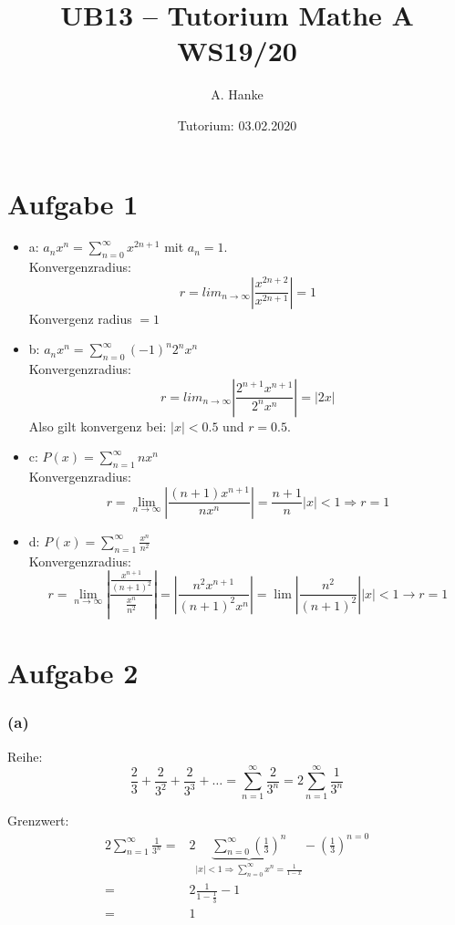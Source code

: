 \documentclass[]{article}
\title{UB13 -- Tutorium Mathe A WS19/20}
\author{A. Hanke}
\date{Tutorium: 03.02.2020}
\providecommand{\tightlist}{%
  \setlength{\itemsep}{0pt}\setlength{\parskip}{0pt}}
\begin{document}
\maketitle

\hypertarget{aufgabe-1}{%
\section{Aufgabe 1}\label{aufgabe-1}}

\begin{itemize}
\tightlist
\item
  a: \(a_nx^n = \sum_{n=0}^{\infty} x^{2n+1}\) mit \(a_n = 1\).\\
  Konvergenzradius:\[ r = lim_{n \rightarrow \infty}\left| \frac{x^{2n + 2} }{x^{2n+1}} \right| = 1\]
  Konvergenz radius \(=1\)
\item
  b: \(a_nx^n = \sum_{n = 0}^{\infty} (-1)^{n} 2^n x^n\)\\
  Konvergenzradius:\[ r = lim_{n \rightarrow \infty}
  \left| \frac{2^{n+1}x^{n+1}}{2^n x^n} \right| = |2x|\] Also gilt
  konvergenz bei: \(|x|< 0.5\) und \(r = 0.5\).
\item
  c: \(P(x) = \sum_{n =1}^{\infty} n x^n\)\\
  Konvergenzradius:\[r = \lim_{n \rightarrow \infty} \left| \frac{(n+1)x^{n+1}}{nx^n} \right| = \frac{n+1}{n} |x| <1 \Rightarrow r = 1\]
\item
  d: \(P(x) = \sum_{n = 1}^\infty \frac{x^n}{n^2}\)\\
  Konvergenzradius:\[r = \lim_{n\rightarrow \infty}
  \left| \frac{\frac{x^{n+1}}{(n+1)^2}}{\frac{x^n}{n^2}} \right| =
  \left|\frac{n^2 x^{n+1}}{(n+1)^2 x^n}\right|=
  \lim \left| \frac{n^2}{(n+1)^2} \right| |x| <1\rightarrow r = 1\]
\end{itemize}

\hypertarget{aufgabe-2}{%
\section{Aufgabe 2}\label{aufgabe-2}}

\hypertarget{a}{%
\subsubsection{(a)}\label{a}}

Reihe:
\[\frac{2}{3} + \frac{2}{3^2} + \frac{2}{3^3} + \dots = \sum_{n = 1}^\infty \frac{2}{3^n} = 2 \sum_{n = 1}^\infty \frac{1}{3^n}\]

Grenzwert: \[
\begin{aligned}
    2 \sum_{n=1}^\infty \frac{1}{3^n} =& 2\underbrace{\sum_{n=0}^\infty \left( \frac{1}{3} \right)^n}_{
    |x|<1 \Rightarrow \sum_{n=0}^\infty x^n = \frac{1}{1-x}
    }- \left( \frac{1}{3} \right)^{n=0}\\
    =&2\frac{1}{1- \frac{1}{3}} -1\\
    =& 1
\end{aligned}
\]
\end{document}
